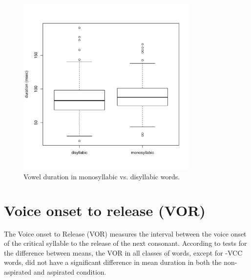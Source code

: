 \documentclass[11pt,a4paper,openany]{memoir}\usepackage[]{graphicx}\usepackage[]{color}
\newenvironment{knitrout}{}{} %
\begin{document}
\begin{figure}
\centering
\begin{knitrout}
\color{fgcolor}
\includegraphics[width=0.8\textwidth]{img/voic-syll-box-1} 

\end{knitrout}
\caption{Vowel duration in monosyllabic vs. disyllabic words.}
\label{f:vvpsyll}
\end{figure}

\section{Voice onset to release (VOR)}



The Voice onset to Release (VOR) measures the interval between the voice onset of the critical syllable to the release of the next consonant.
According to tests for the difference between means, the VOR in all classes of words, except for -VCC words, did not have a significant difference in mean duration in both the non-aspirated and aspirated condition.



\end{document}
